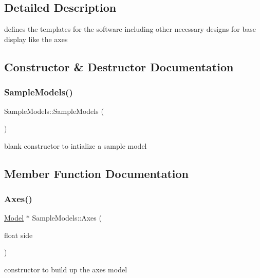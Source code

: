 \subsection{Detailed Description}
defines the templates for the software including other necessary designs for base display like the axes 

\subsection{Constructor \& Destructor Documentation}
\mbox{\label{class_sample_models_ab4f2cabd4d134b925589e2e5e4f3b55b}} 
\subsubsection{\texorpdfstring{Sample\+Models()}{SampleModels()}}
{\footnotesize\ttfamily Sample\+Models\+::\+Sample\+Models (\begin{DoxyParamCaption}{ }\end{DoxyParamCaption})}



blank constructor to intialize a sample model 



\subsection{Member Function Documentation}
\mbox{\label{class_sample_models_a07f69bc5ff6c60078a642ba7e090bf6c}} 
\subsubsection{\texorpdfstring{Axes()}{Axes()}}
{\footnotesize\ttfamily \mbox{\hyperlink{class_model}{Model}} $\ast$ Sample\+Models\+::\+Axes (\begin{DoxyParamCaption}\item[{float}]{side }\end{DoxyParamCaption})\hspace{0.3cm}{\ttfamily [static]}}



constructor to build up the axes model 

